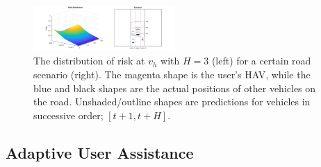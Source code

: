\documentclass[letterpaper, 10 pt, conference]{ieeeconf}  %
\newcommand\NB[1]{$\spadesuit$\footnote{NB: #1}}
\begin{document}
\begin{figure}[ht]
    \includegraphics[width=0.48\textwidth]{fig/assist2.png}
    \caption{The distribution of risk at $v_h$ with $H = 3$ (left) for a certain road scenario (right). The magenta shape is the user's HAV, while the blue and black shapes are the actual positions of other vehicles on the road. Unshaded/outline shapes are predictions for vehicles in successive order; $[t+1,t+H]$.}
    \label{fig:riskd}
\end{figure}




\subsection{Adaptive User Assistance}

\end{document}
